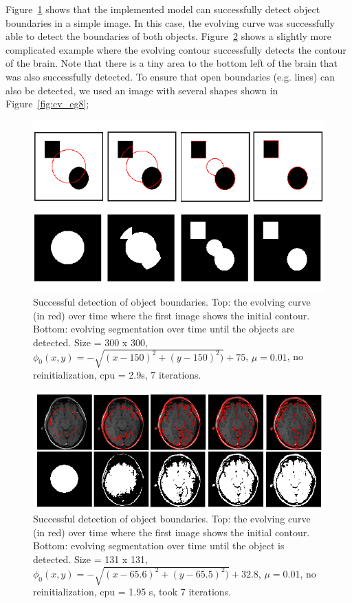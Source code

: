 \documentclass[10pt,journal,letterpaper,compsoc]{IEEEtran}
\begin{document}
Figure~\ref{fig:cv_eg1} shows that the implemented model can successfully detect object boundaries in a simple image. In this case, the evolving curve was
successfully able to detect the boundaries of both objects. Figure~\ref{fig:cv_eg2} shows a slightly more complicated example where the evolving contour
successfully detects the contour of the brain. Note that there is a tiny area to the bottom left of the brain that was also successfully detected. To ensure
that open boundaries (e.g. lines) can also be detected, we used an image with several shapes shown in Figure~\ref{fig:cv_eg8};


\begin{figure}[t]
\centering
\includegraphics[width=12cm]{cv_eg1.png}
\caption{Successful detection of object boundaries. Top: the evolving curve (in red) over time where the first image shows the initial contour.
Bottom: evolving segmentation over time until the objects are detected. Size = 300 x 300, $\phi_{0}(x,y) = - \sqrt{(x - 150)^2 + (y - 150)^2)} + 75$, $\mu =
0.01$, no reinitialization, cpu = 2.9s, 7 iterations.}
\label{fig:cv_eg1}
\end{figure}

\begin{figure}[t]
\centering
\includegraphics[width=12cm]{cv_eg2.png}
\caption{Successful detection of object boundaries. Top: the evolving curve (in red) over time where the first image shows the initial contour.
Bottom: evolving segmentation over time until the object is detected. Size = 131 x 131, $\phi_{0}(x,y) = - \sqrt{(x - 65.6)^2 + (y - 65.5)^2)} + 32.8$, $\mu =
0.01$, no reinitialization, cpu = 1.95 s, took 7 iterations.}
\label{fig:cv_eg2}
\end{figure}
\end{document}
